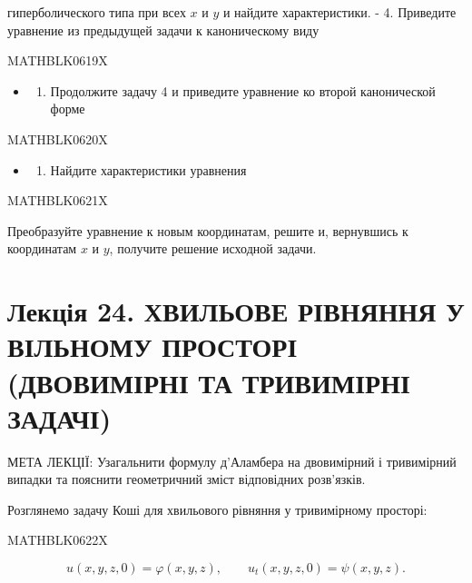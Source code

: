 \documentclass[
  ukrainian,
]{article}
\providecommand{\tightlist}{%
  \setlength{\itemsep}{0pt}\setlength{\parskip}{0pt}}
\begin{document}
гиперболического типа при всех \(x\) и \(y\) и найдите характеристики. -
4. Приведите уравнение из предыдущей задачи к каноническому виду

MATHBLK0619X

\begin{itemize}
\tightlist
\item
  \begin{enumerate}
  \def\labelenumi{\arabic{enumi}.}
  \setcounter{enumi}{4}
  \tightlist
  \item
    Продолжите задачу 4 и приведите уравнение ко второй канонической
    форме
  \end{enumerate}
\end{itemize}

MATHBLK0620X

\begin{itemize}
\tightlist
\item
  \begin{enumerate}
  \def\labelenumi{\arabic{enumi}.}
  \setcounter{enumi}{5}
  \tightlist
  \item
    Найдите характеристики уравнения
  \end{enumerate}
\end{itemize}

MATHBLK0621X

Преобразуйте уравнение к новым координатам, решите и, вернувшись к
координатам \(x\) и \(y\), получите решение исходной задачи.

\section{Лекція 24. ХВИЛЬОВЕ РІВНЯННЯ У ВІЛЬНОМУ ПРОСТОРІ (ДВОВИМІРНІ ТА
ТРИВИМІРНІ
ЗАДАЧІ)}\label{ux43bux435ux43aux446ux456ux44f-24.-ux445ux432ux438ux43bux44cux43eux432ux435-ux440ux456ux432ux43dux44fux43dux43dux44f-ux443-ux432ux456ux43bux44cux43dux43eux43cux443-ux43fux440ux43eux441ux442ux43eux440ux456-ux434ux432ux43eux432ux438ux43cux456ux440ux43dux456-ux442ux430-ux442ux440ux438ux432ux438ux43cux456ux440ux43dux456-ux437ux430ux434ux430ux447ux456-1}

МЕТА ЛЕКЦІЇ: Узагальнити формулу д'Аламбера на двовимірний і тривимірний
випадки та пояснити геометричний зміст відповідних розв'язків.

Розглянемо задачу Коші для хвильового рівняння у тривимірному просторі:

MATHBLK0622X

\[
u(x,y,z,0)=\varphi(x,y,z),
\qquad u_t(x,y,z,0)=\psi(x,y,z).
\]
\end{document}
